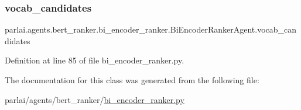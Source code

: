 \subsubsection{\texorpdfstring{vocab\+\_\+candidates}{vocab\_candidates}}
{\footnotesize\ttfamily parlai.\+agents.\+bert\+\_\+ranker.\+bi\+\_\+encoder\+\_\+ranker.\+Bi\+Encoder\+Ranker\+Agent.\+vocab\+\_\+candidates}



Definition at line 85 of file bi\+\_\+encoder\+\_\+ranker.\+py.



The documentation for this class was generated from the following file\+:\begin{DoxyCompactItemize}
\item 
parlai/agents/bert\+\_\+ranker/\hyperlink{bi__encoder__ranker_8py}{bi\+\_\+encoder\+\_\+ranker.\+py}\end{DoxyCompactItemize}

